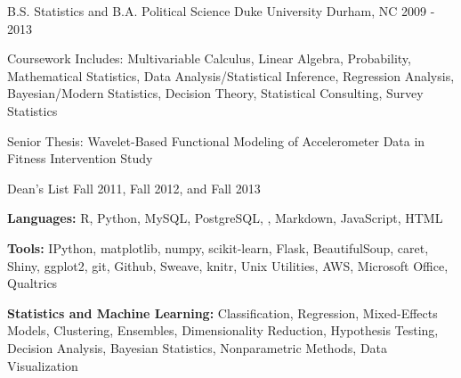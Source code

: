\documentclass[11pt, a4paper]{awesome-cv}
\begin{document}
\makecvheader

\begin{cventries}
  \vspace{.5 mm}
  \cventry
    {B.S. Statistics and B.A. Political Science}
    {Duke University}
    {Durham, NC}
    {2009 - 2013}
    {
      \begin{cvitems}
        \item{Coursework Includes: Multivariable Calculus, Linear Algebra, Probability,
        Mathematical Statistics, Data Analysis/Statistical Inference, Regression Analysis, 
        Bayesian/Modern Statistics, Decision Theory, Statistical Consulting, Survey Statistics}
        \item{Senior Thesis: Wavelet-Based Functional Modeling of Accelerometer Data 
        in Fitness Intervention Study}
        \item{Dean’s List Fall 2011, Fall 2012, and Fall 2013}
      \end{cvitems}
    }
\end{cventries}

\begin{cventries}
  \cventry
    {}
    {}
    {}
    {}
    {
      \begin{cvitems}
        \item{\textbf{Languages:} R, Python, MySQL, PostgreSQL, , Markdown, JavaScript, HTML}
        \item{\textbf{Tools:} IPython, matplotlib, numpy, scikit-learn, Flask, BeautifulSoup, caret, Shiny, ggplot2, git, Github, Sweave, knitr,
        Unix Utilities, AWS, Microsoft Office, Qualtrics}
        \item{\textbf{Statistics and Machine Learning:} Classification, Regression, Mixed-Effects Models, Clustering, Ensembles,
        Dimensionality Reduction, Hypothesis Testing, Decision Analysis, Bayesian Statistics, Nonparametric Methods, Data Visualization}
      \end{cvitems}
    }
\end{cventries}
\end{document}
